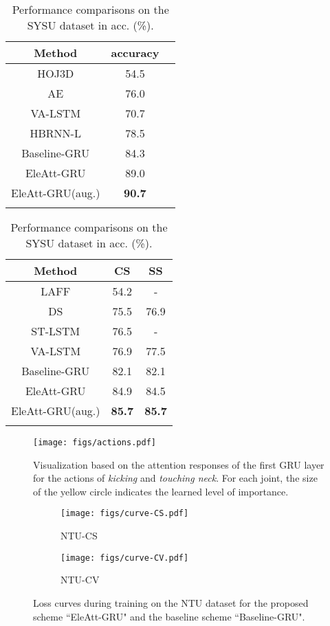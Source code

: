 \documentclass[runningheads]{llncs}
\begin{document}
\setlength{\tabcolsep}{7pt}
\begin{table}[!t]
	\parbox{.44\linewidth}{
		\centering
		\caption{Performance comparisons on the N-UCLA dataset in acc. (\%).}
		\begin{tabular}{ccc}
			\toprule
			Method & accuracy \\ \midrule
HOJ3D \cite{xia2012view}          & 54.5      \\ 
			AE  \cite{wang2014learning}            & 76.0    \\ 
VA-LSTM \cite{zhang2017view}            & 70.7 \\			
			HBRNN-L \cite{du2015hierarchical}        & 78.5     \\ 
\midrule
Baseline-GRU & 84.3 \\ EleAtt-GRU & 89.0 \\ EleAtt-GRU(aug.) & \bf{90.7}\\ \bottomrule     
			\label{tab:N-UCLA}
\end{tabular}
	}
	\hfill
	\parbox{.5\linewidth}{
		\centering
		\caption{Performance comparisons on the SYSU dataset in acc. (\%).}
		\begin{tabular}{ccc}
			\toprule
			Method & CS  & SS \\
			\midrule
			LAFF \cite{hu2016real} & 54.2 & - \\
			DS \cite{hu2015jointly} & 75.5 & 76.9 \\	
			ST-LSTM\cite{liu2016spatio} & 76.5 & - \\
			VA-LSTM \cite{zhang2017view} & 76.9 & 77.5 \\
			\midrule
Baseline-GRU  &  82.1  & 82.1 \\
			EleAtt-GRU & 84.9 & 84.5 \\
			EleAtt-GRU(aug.) & \bf{85.7} & \bf{85.7} \\
			\bottomrule      
			\label{tab:SYSU}
\end{tabular}
	}
\end{table}

\begin{figure}[t] \centering
	\texttt{[image: figs/actions.pdf]}
	\caption{Visualization based on the attention responses of the first GRU layer for the actions of \emph{kicking} and \emph{touching neck}. For each joint, the size of the yellow circle indicates the learned level of importance.}	
\label{fig:vis}
\end{figure}

\begin{figure}[!ttp]
	\centering
	\begin{subfigure}[t]{0.45\linewidth}
		\centering\texttt{[image: figs/curve-CS.pdf]}
\caption{NTU-CS}
		\label{subfig:CS}
	\end{subfigure}	
	\begin{subfigure}[t]{0.45\linewidth}
		\centering\texttt{[image: figs/curve-CV.pdf]}
\caption{NTU-CV}			
		\label{subfig:CV}
	\end{subfigure}
\caption{Loss curves during training on the NTU dataset for the proposed scheme ``EleAtt-GRU" and the baseline scheme ``Baseline-GRU".}\label{fig:curve}
\end{figure}
\end{document}
